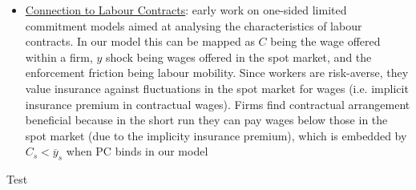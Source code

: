 \documentclass{article}
\begin{document}
\begin{itemize}
\begin{itemize}
    \end{itemize}
    \item \underline{Connection to Labour Contracts}: early work on one-sided limited commitment models aimed at analysing the characteristics of labour contracts. In our model this can be mapped as $C$ being the wage offered within a firm, $y$ shock being wages offered in the spot market, and the enforcement friction being labour mobility. Since workers are risk-averse, they value insurance against fluctuations in the spot market for wages (i.e. implicit insurance premium in contractual wages). Firms find contractual arrangement beneficial because in the short run they can pay wages below those in the spot market (due to the implicity insurance premium), which is embedded by $C_{s} < \overline{y}_{s}$ when PC binds in our model
\end{itemize}

\newpage

Test
\end{document}
